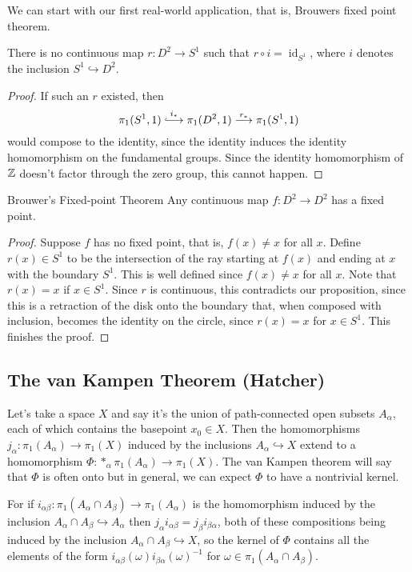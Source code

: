 \orbreak
We can start with our first real-world application, that is, Brouwers fixed point theorem.
\begin{prop}
    There is no continuous map $r \colon D^2 \to S^1 $ such that $r \circ i=\operatorname{id}_{S^1 }$, where $i$ denotes the inclusion $S^1 \hookrightarrow D^2$.
\end{prop}
\begin{proof}
    If such an $r$ existed, then \[
        \pi_1(S^1 ,1) \overset{i_*}{\lhook\joinrel\longrightarrow} \pi_1(D^2,1) \overset{r_*}{\longrightarrow} \pi_1(S^1 ,1)
    \] would compose to the identity, since the identity induces the identity homomorphism on the fundamental groups. Since the identity homomorphism of $\mathbb{Z}$ doesn't factor through the zero group, this cannot happen.
\end{proof}
\begin{namedthm}{Brouwer's Fixed-point Theorem}
    Any continuous map $f\colon D^2 \to D^2$ has a fixed point.
\end{namedthm}
\begin{proof}
    Suppose $f$ has no fixed point, that is, $f(x)\neq x$ for all $ x$. Define $r(x)\in S^1 $ to be the intersection of the ray starting at $f(x)$ and ending at $x$ with the boundary $S^1 $. This is well defined since $f(x)\neq x$ for all $x.$ Note that $r(x)=x$ if $x\in S^1 $. Since $r$ is continuous, this contradicts our proposition, since this is a retraction of the disk onto the boundary that, when composed with inclusion, becomes the identity on the circle, since $r(x)=x$ for $x\in S^1 $. This finishes the proof.
\end{proof}

\subsection{The van Kampen Theorem (Hatcher)}
Let's take a space $X$ and say it's the union of path-connected open subsets $A_{\alpha}$, each of which contains the basepoint $x_0\in X$. Then the homomorphisms $j_{\alpha} \colon \pi_1(A_{\alpha}) \to \pi_1(X)$ induced by the inclusions $A_{\alpha}\hookrightarrow X$ extend to a homomorphism $\Phi \colon *_{\alpha}\pi_1(A_{\alpha}) \to \pi_1(X)$. The van Kampen theorem will say that $\Phi$ is often onto but in general, we can expect $\Phi$ to have a nontrivial kernel. 

For if $i_{\alpha\beta} \colon  \pi_1(A_{\alpha}\cap A_{\beta}) \to \pi_1(A_{\alpha})$ is the homomorphism induced by the inclusion $A_{\alpha}\cap A_{\beta}\hookrightarrow A_{\alpha}$ then $j_{\alpha}i_{\alpha\beta}=j_{\beta}i_{\beta\alpha}$, both of these compositions being induced by the inclusion $A_{\alpha}\cap A_{\beta}\hookrightarrow X$, so the kernel of $\Phi$ contains all the elements of the form $i_{\alpha\beta}(\omega)i_{\beta\alpha}(\omega)^{-1}$ for $\omega \in \pi_1(A_{\alpha}\cap A_{\beta})$. 

